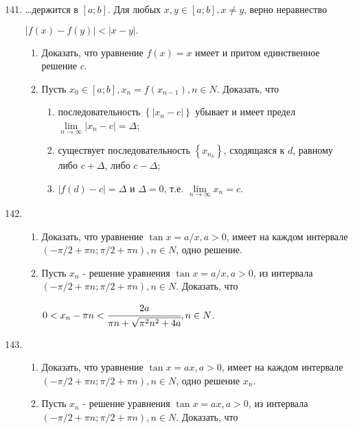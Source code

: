 \documentclass[a4paper]{article}
\begin{document}
\begin{enumerate} [label=\textbf{\arabic*.}]
\setcounter{enumi}{140}
\item \dots держится в $\left[a;b\right]$. Для любых $x, y \in \left[a;b\right], x\not=y$, верно неравнество
\begin{center}
	$\left|f(x)-f(y)\right|<\left|x-y\right|.$
\end{center}
	\begin{enumerate}
		\item
			Доказать, что уравнение $f(x)=x$ имеет и притом единственное решение $c$.
		\item
			Пусть $x_0 \in [a;b], x_n=f(x_{n-1}), n\in N$. Доказать, что
			\begin{enumerate}
				\item
					последовательность $\left\{\left|x_n-c\right|\right\}$ убывает и имеет предел \\ $\lim\limits_{n \to \infty} {\left|x_n-c\right|}=\Delta$;
				\item
					существует последовательность $\left\{x_{n_k}\right\}$, сходящаяся к $d$, равному либо $c+\Delta$, либо $c-\Delta$;
				\item
					$\left|f(d)-c\right|=\Delta$ и $\Delta=0$, т.е. $\lim\limits_{n \to \infty} {x_n}=c$.
			\end{enumerate}
	\end{enumerate}
\item 	\begin{enumerate}
		\item
			Доказать, что уравнение $\tan x=a/x, a>0$, имеет на каждом интервале $(-\pi/2+\pi n; \pi/2+\pi n), n\in N$, одно решение.
		\item
			Пусть $x_n$ - решение уравнения $\tan x=a/x, a>0$, из интервала $(-\pi/2+\pi n; \pi/2+\pi n), n\in N$. Доказать, что
			\begin{center}
				$0<x_n-\pi n<\cfrac{2a}{\pi n+\sqrt{\pi^2 n^2+4a}},n\in N$.
			\end{center}
	\end{enumerate}
\item 	\begin{enumerate}
		\item \makeatletter{}\makeatother \label{1}
			Доказать, что уравнение $\tan x=ax, a>0$, имеет на каждом интервале $(-\pi/2+\pi n; \pi/2+\pi n), n\in N$, одно решение $x_n$.
		\item \makeatletter\def\@currentlabel{2}\makeatother \label{2}
			Пусть $x_n$ - решение уравнения $\tan x=ax, a>0$, из интервала $(-\pi/2+\pi n; \pi/2+\pi n), n\in N$. Доказать, что

\end{enumerate}
\end{enumerate}
\end{document}
